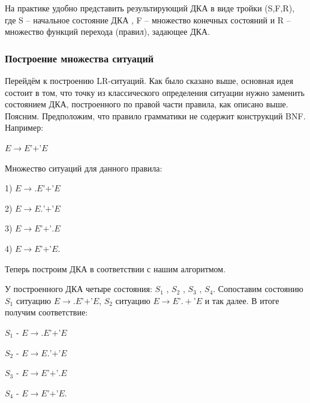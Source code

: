 На практике удобно представить результирующий ДКА в виде тройки (S,F,R), где S -- начальное состояние ДКА , F -- множество конечных состояний и R -- множество функций перехода (правил), задающее ДКА.

\subsubsection{Построение множества ситуаций}

Перейдём к построению LR-ситуаций. Как было сказано выше, основная идея состоит в том, что точку из классического определения ситуации нужно заменить состоянием ДКА, построенного по правой части правила, как описано выше. Поясним. Предположим, что правило грамматики не содержит конструкций BNF. Например:

\hspace{0,9cm} $E \rightarrow E $'$+$'$ E$

Множество ситуаций для данного правила:

\hspace{0,9cm} 1) $E \rightarrow .E $'$+$'$ E$

\hspace{0,9cm} 2) $E \rightarrow E. $'$+$'$ E$

\hspace{0,9cm} 3) $E \rightarrow E $'$+$'$ .E$

\hspace{0,9cm} 4) $E \rightarrow E $'$+$'$ E.$

Теперь построим ДКА в соответствии с нашим алгоритмом. 

У построенного ДКА четыре состояния: $S_{1}$ , $S_{2}$ , $S_{3}$ , $S_{4}$. Сопоставим состоянию $S_{1}$ ситуацию $E \rightarrow .E $'$+$'$ E$, $S_{2}$ ситуацию $E \rightarrow E $'$.+$'$ E$ и так далее. В итоге получим соответствие: 

\hspace{0,9cm} $S_{1}$ - $E \rightarrow .E $'$+$'$ E$

\hspace{0,9cm} $S_{2}$ - $E \rightarrow E .$'$+$'$ E$

\hspace{0,9cm} $S_{3}$ - $E \rightarrow E $'$+$'$ .E$

\hspace{0,9cm} $S_{4}$ - $E \rightarrow E $'$+$'$ E.$

